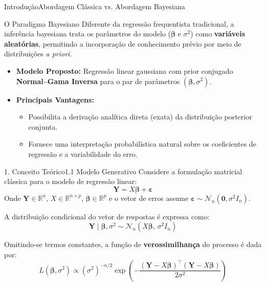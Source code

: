 \documentclass[10pt,aspectratio=169]{beamer}
\begin{document}
\begin{frame}{Introdução}{Abordagem Clássica vs. Abordagem Bayesiana}
    \begin{block}{O Paradigma Bayesiano}
        Diferente da regressão frequentista tradicional, a inferência bayesiana trata os parâmetros do modelo ($\boldsymbol{\beta}$ e $\sigma^2$) como \textbf{variáveis aleatórias}, permitindo a incorporação de conhecimento prévio por meio de distribuições \textit{a priori}.
    \end{block}
    \vspace{0.2cm}
    \begin{itemize}
        \item \textbf{Modelo Proposto:} Regressão linear gaussiana com prior conjugado \textbf{Normal--Gama Inversa} para o par de parâmetros $(\boldsymbol{\beta}, \sigma^2)$.
        \item \textbf{Principais Vantagens:} 
        \begin{itemize}
            \item Possibilita a derivação analítica direta (exata) da distribuição posterior conjunta.
            \item Fornece uma interpretação probabilística natural sobre os coeficientes de regressão e a variabilidade do erro.
        \end{itemize}
    \end{itemize}
\end{frame}

\begin{frame}{1. Conceito Teórico}{1.1 Modelo Generativo}
    Considere a formulação matricial clássica para o modelo de regressão linear:
    $$\mathbf{Y} = X\boldsymbol{\beta} + \boldsymbol{\varepsilon}$$
    Onde $\mathbf{Y} \in \mathbb{R}^{n}$, $X \in \mathbb{R}^{n \times p}$, $\boldsymbol{\beta} \in \mathbb{R}^{p}$ e o vetor de erros assume $\boldsymbol{\varepsilon} \sim \mathcal{N}_n(\mathbf{0}, \sigma^2 I_n)$.
    \vspace{0.2cm}
    
    A distribuição condicional do vetor de respostas é expressa como:
    $$\mathbf{Y} \mid \boldsymbol{\beta}, \sigma^2 \sim \mathcal{N}_n(X\boldsymbol{\beta},\, \sigma^2 I_n)$$
    
    Omitindo-se termos constantes, a função de \textbf{verossimilhança} do processo é dada por:
    $$L(\boldsymbol{\beta}, \sigma^2) \propto (\sigma^2)^{-n/2} \exp\left( -\frac{(\mathbf{Y} - X\boldsymbol{\beta})^\top(\mathbf{Y} - X\boldsymbol{\beta})}{2\sigma^2} \right)$$
\end{frame}
\end{document}
